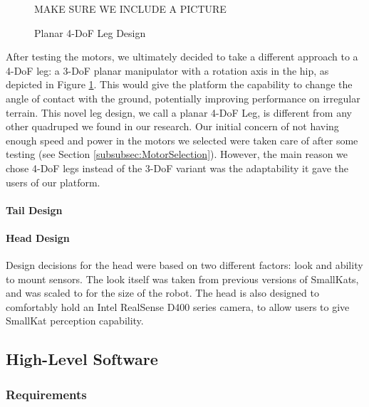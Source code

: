                 \begin{figure}
                    \centering
                    MAKE SURE WE INCLUDE A PICTURE
                    \caption{Planar 4-DoF Leg Design}
                    \label{fig:Planar4DoF}
                \end{figure}

                After testing the motors, we ultimately decided to take a different approach to a 4-DoF leg: a 3-DoF planar manipulator with a rotation axis in the hip, as depicted in Figure \ref{fig:Planar4DoF}. This would give the platform the capability to change the angle of contact with the ground, potentially improving performance on irregular terrain. This novel leg design, we call a planar 4-DoF Leg, is different from any other quadruped we found in our research. Our initial concern of not having enough speed and power in the motors we selected were taken care of after some testing (see Section \ref{subsubsec:MotorSelection}). However, the main reason we chose 4-DoF legs instead of the 3-DoF variant was the adaptability it gave the users of our platform.

            \paragraph{Tail Design}
                
            \paragraph{Head Design}
                Design decisions for the head were based on two different factors: look and ability to mount sensors. The look itself was taken from previous versions of SmallKats, and was scaled to for the size of the robot. The head is also designed to comfortably hold an Intel RealSense D400 series camera, to allow users to give SmallKat perception capability.



    \subsection{High-Level Software}

        \subsubsection{Requirements} 
